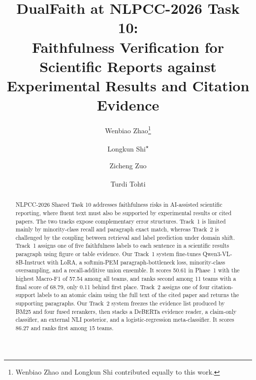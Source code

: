 \documentclass[runningheads]{llncs}
\newcommand{\method}{DualFaith}
\newcommand{\mf}{Macro-F1}
\begin{document}
\title{\texorpdfstring{\method{} at NLPCC-2026 Task 10:\\
Faithfulness Verification for Scientific Reports against Experimental Results and Citation Evidence}{DualFaith at NLPCC-2026 Task 10: Faithfulness Verification for Scientific Reports against Experimental Results and Citation Evidence}}

\author{Wenbiao Zhao\thanks{Wenbiao Zhao and Longkun Shi contributed equally to this work.} \and
Longkun Shi\textsuperscript{$\star$} \and
Zicheng Zuo \and
Turdi Tohti\textsuperscript{\Letter}}

\maketitle

\begin{abstract}
NLPCC-2026 Shared Task 10 addresses faithfulness risks in AI-assisted scientific reporting, where fluent text must also be supported by experimental results or cited papers. The two tracks expose complementary error structures. Track~1 is limited mainly by minority-class recall and paragraph exact match, whereas Track~2 is challenged by the coupling between retrieval and label prediction under domain shift. Track~1 assigns one of five faithfulness labels to each sentence in a scientific results paragraph using figure or table evidence. Our Track~1 system fine-tunes Qwen3-VL-8B-Instruct with LoRA, a softmin-PEM paragraph-bottleneck loss, minority-class oversampling, and a recall-additive union ensemble. It scores 50.61 in Phase~1 with the highest \mf{} of 57.54 among all teams, and ranks second among 11 teams with a final score of 68.79, only 0.11 behind first place. Track~2 assigns one of four citation-support labels to an atomic claim using the full text of the cited paper and returns the supporting paragraphs. Our Track~2 system freezes the evidence list produced by BM25 and four fused rerankers, then stacks a DeBERTa evidence reader, a claim-only classifier, an external NLI posterior, and a logistic-regression meta-classifier. It scores 86.27 and ranks first among 15 teams.
\end{abstract}
\end{document}
